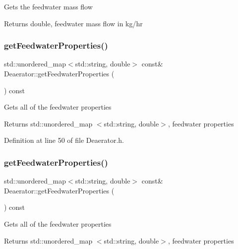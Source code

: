Gets the feedwater mass flow \begin{DoxyReturn}{Returns}
double, feedwater mass flow in kg/hr 
\end{DoxyReturn}
\mbox{\label{class_deaerator_a74f7916b125f4964b0f534940f590633}} 
\subsubsection{\texorpdfstring{get\+Feedwater\+Properties()}{getFeedwaterProperties()}\hspace{0.1cm}{\footnotesize\ttfamily [1/3]}}
{\footnotesize\ttfamily std\+::unordered\+\_\+map$<$std\+::string, double$>$ const\& Deaerator\+::get\+Feedwater\+Properties (\begin{DoxyParamCaption}{ }\end{DoxyParamCaption}) const\hspace{0.3cm}{\ttfamily [inline]}}

Gets all of the feedwater properties \begin{DoxyReturn}{Returns}
std\+::unordered\+\_\+map $<$std\+::string, double$>$, feedwater properties 
\end{DoxyReturn}


Definition at line 50 of file Deaerator.\+h.

\mbox{\label{class_deaerator_a74f7916b125f4964b0f534940f590633}} 
\subsubsection{\texorpdfstring{get\+Feedwater\+Properties()}{getFeedwaterProperties()}\hspace{0.1cm}{\footnotesize\ttfamily [2/3]}}
{\footnotesize\ttfamily std\+::unordered\+\_\+map$<$std\+::string, double$>$ const\& Deaerator\+::get\+Feedwater\+Properties (\begin{DoxyParamCaption}{ }\end{DoxyParamCaption}) const\hspace{0.3cm}{\ttfamily [inline]}}

Gets all of the feedwater properties \begin{DoxyReturn}{Returns}
std\+::unordered\+\_\+map $<$std\+::string, double$>$, feedwater properties 
\end{DoxyReturn}


